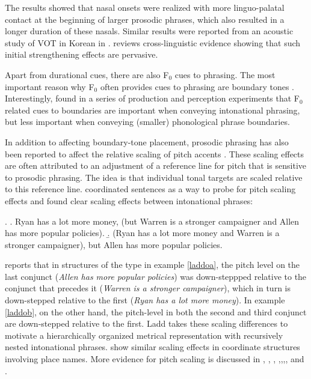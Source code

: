 \documentclass[preprint,review,12pt,authoryear,times]{elsarticle}
\begin{document}
\noindent The results showed that nasal onsets were realized with more linguo-palatal contact at the beginning of larger prosodic phrases, which also resulted in a longer duration of these nasals. Similar results were reported from an acoustic study of VOT in Korean in \citet{Jun93}.  \citet{keati03} reviews cross-linguistic evidence showing that such initial strengthening effects are pervasive.

Apart from durational cues, there are also F$_0$ cues to phrasing. The most important reason why F$_0$ often provides cues to phrasing are boundary tones \citep[][i.a.]{pierr80,ladd08}. Interestingly, \citet{gollr13} found in a series of production and perception experiments that F$_0$ related cues to boundaries are important when conveying intonational phrasing, but less important when conveying (smaller) phonological phrase boundaries. 

In addition to affecting boundary-tone placement, prosodic phrasing has also been reported to affect the relative scaling of pitch accents \citep{ladd88}. These scaling effects are  often attributed to an adjustment of a reference line for pitch that is sensitive to prosodic phrasing. The idea is that individual tonal targets are scaled relative to this reference line. \citet{ladd88} coordinated sentences as a way to probe for pitch scaling effects and found clear scaling effects between intonational phrases:

\ex.\label{laddoo}
\a. Ryan has a lot more money, (but Warren is a stronger campaigner and Allen has more popular policies).\label{laddoa}
\b. (Ryan has a lot more money and Warren is a stronger campaigner), but Allen has more popular policies.\label{laddob}

\noindent \citet{ladd88} reports that in structures of the type in example \ref{laddoa},  the pitch level on the last conjunct ({\em Allen has more popular policies}) was down-steppped relative to the conjunct that precedes it ({\em Warren is a stronger campaigner}), which in turn is down-stepped relative to the first ({\em Ryan has a lot more money}). In example  \ref{laddob}, on the other hand, the pitch-level in both the second and third conjunct are down-stepped relative to the first. Ladd takes these scaling differences to motivate  a hierarchically organized metrical representation with recursively nested intonational phrases.  \citet{vanden92} show similar  scaling effects in coordinate structures involving place names. More evidence for pitch scaling is discussed in \citet{Kuboz89}, \citet{Kuboz92}, \citet{vanden92}, \citet{fery05},\citet{fery10b},\citet{kentn13},\citet{truck15}, and \citet{petro17}.
\end{document}

